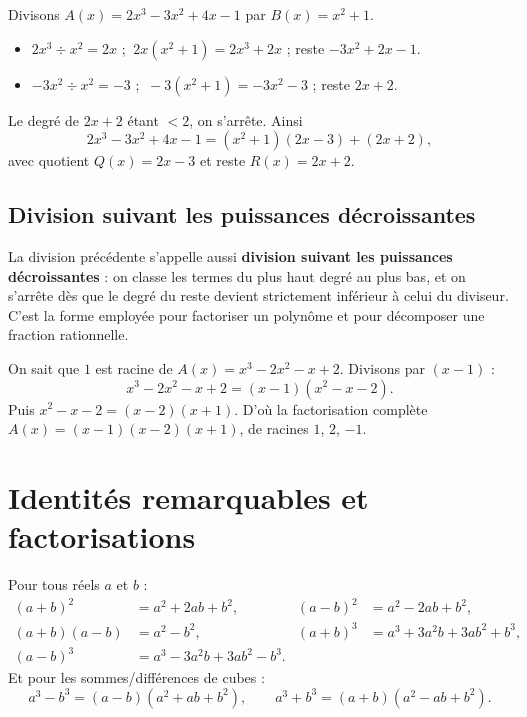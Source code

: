 \begin{exemple}
Divisons $A(x)=2x^3-3x^2+4x-1$ par $B(x)=x^2+1$.
\begin{itemize}
  \item $2x^3 \div x^2 = 2x$ ; $\ 2x(x^2+1)=2x^3+2x$ ; reste $-3x^2+2x-1$.
  \item $-3x^2 \div x^2 = -3$ ; $\ -3(x^2+1)=-3x^2-3$ ; reste $2x+2$.
\end{itemize}
Le degré de $2x+2$ étant $<2$, on s'arrête. Ainsi
\[ 2x^3-3x^2+4x-1=(x^2+1)(2x-3)+(2x+2), \]
avec quotient $Q(x)=2x-3$ et reste $R(x)=2x+2$.
\end{exemple}

\subsection{Division suivant les puissances décroissantes}

\begin{remarque}
La division précédente s'appelle aussi \textbf{division suivant les puissances
décroissantes} : on classe les termes du plus haut degré au plus bas, et on s'arrête dès
que le degré du reste devient strictement inférieur à celui du diviseur. C'est la forme
employée pour factoriser un polynôme et pour décomposer une fraction rationnelle.
\end{remarque}

\begin{exemple}
On sait que $1$ est racine de $A(x)=x^3-2x^2-x+2$. Divisons par $(x-1)$ :
\[ x^3-2x^2-x+2=(x-1)(x^2-x-2). \]
Puis $x^2-x-2=(x-2)(x+1)$. D'où la factorisation complète
$A(x)=(x-1)(x-2)(x+1)$, de racines $1$, $2$, $-1$.
\end{exemple}

\section{Identités remarquables et factorisations}

\begin{propriete}
Pour tous réels $a$ et $b$ :
\begin{align*}
(a+b)^2 &= a^2+2ab+b^2, & (a-b)^2 &= a^2-2ab+b^2,\\
(a+b)(a-b) &= a^2-b^2, & (a+b)^3 &= a^3+3a^2b+3ab^2+b^3,\\
(a-b)^3 &= a^3-3a^2b+3ab^2-b^3. &&
\end{align*}
Et pour les sommes/différences de cubes :
\[ a^3-b^3=(a-b)(a^2+ab+b^2),\qquad a^3+b^3=(a+b)(a^2-ab+b^2). \]
\end{propriete}


